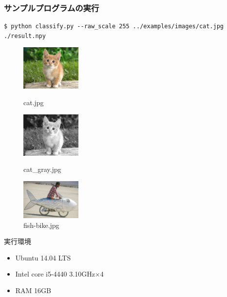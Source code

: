 \documentclass[dvipdfmx,11pt,notheorems]{beamer}
\theoremstyle{definition}
\begin{document}
\begin{frame}[fragile]\frametitle{サンプルプログラムの実行}
 \begin{lstlisting}[basicstyle=\ttfamily\footnotesize, frame=single]
$ python classify.py --raw_scale 255 ../examples/images/cat.jpg ./result.npy
\end{lstlisting}

\begin{figure}[t]
 \begin{minipage}{0.3\hsize}
  \centering
  \includegraphics[width=30mm]{./figure/cat.eps}
  \caption{cat.jpg}
  \label{sample1}
 \end{minipage}
 \begin{minipage}{0.3\hsize}
  \centering
  \includegraphics[width=30mm]{./figure/cat_gray.eps}
  \caption{cat\_gray.jpg}
  \label{sample2}
 \end{minipage}
 \begin{minipage}{0.3\hsize}
  \centering
  \includegraphics[width=30mm]{./figure/fish-bike.eps}
  \caption{fish-bike.jpg}
  \label{sample3}
 \end{minipage}
\end{figure}
\begin{exampleblock}{実行環境}
\begin{itemize}
 \item Ubuntu 14.04 LTS
 \item Intel core i5-4440 3.10GHz$\times$4
 \item RAM 16GB
\end{itemize}
\end{exampleblock}
\end{frame}
\end{document}
